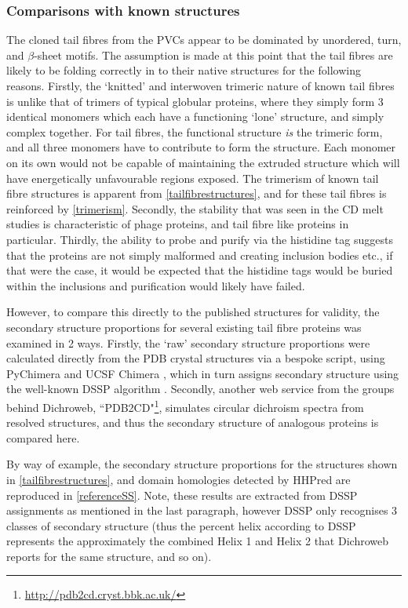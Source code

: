 \subsubsection{Comparisons with known structures}\label{comparisons}
The cloned tail fibres from the PVCs appear to be dominated by unordered, turn, and $\beta$-sheet motifs. The assumption is made at this point that the tail fibres are likely to be folding correctly in to their native structures for the following reasons. Firstly, the `knitted' and interwoven trimeric nature of known tail fibres is unlike that of trimers of typical globular proteins, where they simply form 3 identical monomers which each have a functioning `lone' structure, and simply complex together. For tail fibres, the functional structure \emph{is} the trimeric form, and all three monomers have to contribute to form the structure. Each monomer on its own would not be capable of maintaining the extruded structure which will have energetically unfavourable regions exposed. The trimerism of known tail fibre structures is apparent from \vref{tailfibrestructures}, and for these tail fibres is reinforced by \vref{trimerism}. Secondly, the stability that was seen in the CD melt studies is characteristic of phage proteins, and tail fibre like proteins in particular. Thirdly, the ability to probe and purify via the histidine tag suggests that the proteins are not simply malformed and creating inclusion bodies etc., if that were the case, it would be expected that the histidine tags would be buried within the inclusions and purification would likely have failed.

However, to compare this directly to the published structures for validity, the secondary structure proportions for several existing tail fibre proteins was examined in 2 ways. Firstly, the `raw' secondary structure proportions were calculated directly from the PDB crystal structures via a bespoke script, using PyChimera \citep{Rodriguez-GuerraPedregal2018} and UCSF Chimera \citep{Pettersen2004}, which in turn assigns secondary structure using the well-known DSSP algorithm \citep{Kabsch1983}. Secondly, another web service from the groups behind Dichroweb, ``PDB2CD"\footnote{\url{http://pdb2cd.cryst.bbk.ac.uk/}}, simulates circular dichroism spectra from resolved structures, and thus the secondary structure of analogous proteins is compared here.

By way of example, the secondary structure proportions for the structures shown in \vref{tailfibrestructures}, and domain homologies detected by HHPred are reproduced in \vref{referenceSS}. Note, these results are extracted from DSSP assignments as mentioned in the last paragraph, however DSSP only recognises 3 classes of secondary structure (thus the percent helix according to DSSP represents the approximately the combined Helix 1 and Helix 2 that Dichroweb reports for the same structure, and so on).


